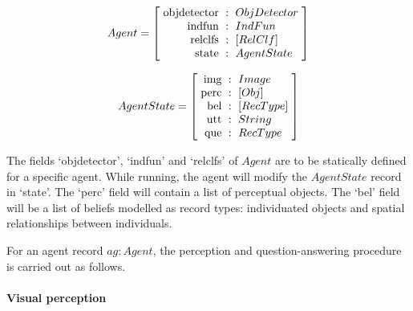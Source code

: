 \begin{equation}\label{eq:agent}
Agent = \rec{
    \text{objdetector} &:& ObjDetector \\
    \text{indfun} &:& IndFun \\
    \text{relclfs} &:& [RelClf] \\
    \text{state} &:& AgentState \\
    }
\end{equation}

\begin{equation}\label{eq:state}
AgentState = \rec{
    \text{img} &:& Image \\
    \text{perc} &:& [Obj] \\
    \text{bel} &:& [RecType] \\
    \text{utt} &:& String \\
    \text{que} &:& RecType \\
    }
\end{equation}

The fields `objdetector', `indfun' and `relclfs' of $Agent$ are to be statically defined for a specific agent.
While running, the agent will modify the $AgentState$ record in `state'.
The `perc' field will contain a list of perceptual objects.
The `bel' field will be a list of beliefs modelled as record types:
individuated objects and spatial relationships between individuals.

For an agent record $ag : Agent$, the perception and question-answering procedure is carried out as follows.

\paragraph{Visual perception}

